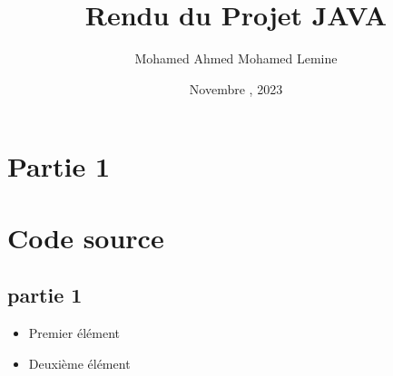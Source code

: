 \documentclass{article}
\begin{document}
\title{Rendu du Projet JAVA}
\author{Mohamed Ahmed Mohamed Lemine}
\date{Novembre , 2023}
\maketitle

\section[une petité description]{Partie 1}

\section{Code source}
\subsection{partie 1}
\begin{itemize}
    \item Premier élément
    \item Deuxième élément
\end{itemize}
\end{document}
